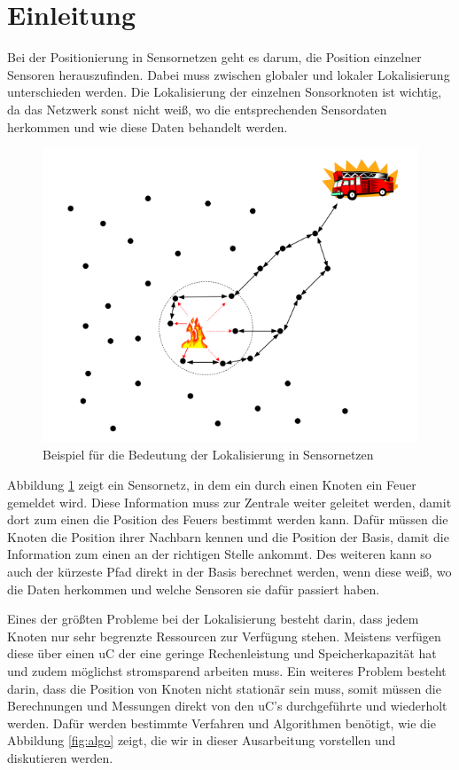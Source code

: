 \section{Einleitung}
\label{sec:einleitiung}

Bei der Positionierung in Sensornetzen geht es darum, die Position
einzelner Sensoren herauszufinden. Dabei muss zwischen globaler und
lokaler Lokalisierung unterschieden werden. Die Lokalisierung der
einzelnen Sonsorknoten ist wichtig, da das Netzwerk sonst nicht weiß,
wo die entsprechenden Sensordaten herkommen und wie diese Daten
behandelt werden.

\begin{figure}[h!]
  \centering
  \includegraphics[scale=0.6]{img/lokalisierung_1}

  \caption{Beispiel für die Bedeutung der Lokalisierung in
    Sensornetzen}
  \label{fig:local}
\end{figure}

Abbildung \ref{fig:local} zeigt ein Sensornetz, in dem ein durch einen
Knoten ein Feuer gemeldet wird. Diese Information muss zur Zentrale
weiter geleitet werden, damit dort zum einen die Position des Feuers
bestimmt werden kann. Dafür müssen die Knoten die Position ihrer
Nachbarn kennen und die Position der Basis, damit die Information zum
einen an der richtigen Stelle ankommt. Des weiteren kann so auch der
kürzeste Pfad direkt in der Basis berechnet werden, wenn diese weiß,
wo die Daten herkommen und welche Sensoren sie dafür passiert haben.
\cite{gholami2011} 

Eines der größten Probleme bei der Lokalisierung besteht darin, dass
jedem Knoten nur sehr begrenzte Ressourcen zur Verfügung stehen.
Meistens verfügen diese über einen \ac{uC} der eine geringe
Rechenleistung und Speicherkapazität hat und zudem möglichst
stromsparend arbeiten muss. \cite{timmermann} Ein weiteres Problem
besteht darin, dass die Position von Knoten nicht stationär sein muss,
somit müssen die Berechnungen und Messungen direkt von den \ac{uC}'s
durchgeführte und wiederholt werden. \cite{roehrig2009} Dafür werden
bestimmte Verfahren und Algorithmen benötigt, wie die Abbildung
\ref{fig:algo} zeigt, die wir in dieser Ausarbeitung vorstellen und
diskutieren werden.

